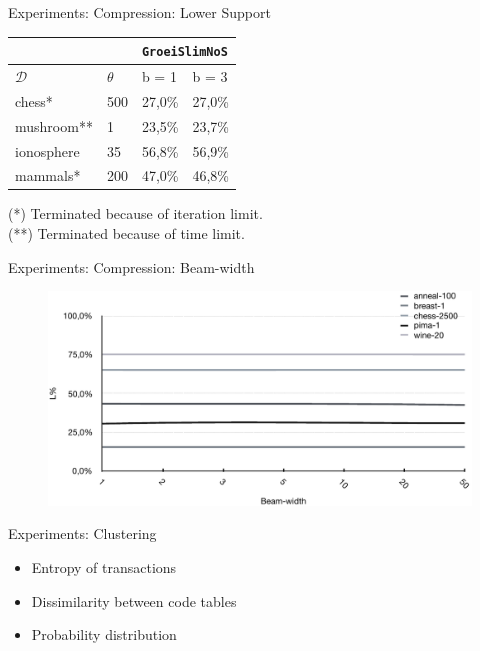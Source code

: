 \documentclass{beamer}
\newcommand{\dataset}{\mathcal{D}}
\begin{document}
\begin{frame}{Experiments: Compression: Lower Support}
\begin{table}[ht]
\centering
\begin{tabular}{ll|ll}
                  &          & \multicolumn{2}{l}{\texttt{GroeiSlimNoS}} \\ \hline
$\dataset$        & $\theta$ & b = 1          & b = 3          \\ \hline
chess*            & 500      & 27,0\%         & 27,0\%         \\
mushroom**        & 1        & 23,5\%         & 23,7\%         \\
ionosphere        & 35       & 56,8\%         & 56,9\%         \\
mammals*          & 200      & 47,0\%         & 46,8\%           
\end{tabular}
\end{table}
 (*) Terminated because of iteration limit. \\
 (**) Terminated because of time limit.
\end{frame}

\begin{frame}{Experiments: Compression: Beam-width}
\begin{figure}[H]
  \centering
   \includegraphics[width=\textwidth]{img/var_bw}
\end{figure}
\end{frame}

\begin{frame}{Experiments: Clustering}
	\begin{itemize}
		\item Entropy of transactions
		\item Dissimilarity between code tables
		\item Probability distribution 
	\end{itemize}
\end{frame}
\end{document}
